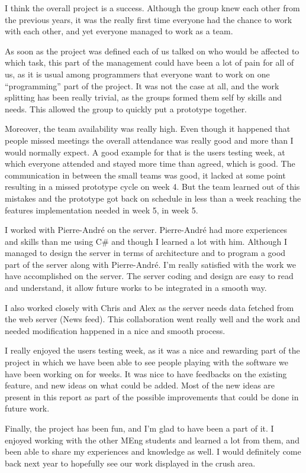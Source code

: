 I think the overall project is a success. Although the group knew each
other from the previous years, it was the really first time everyone had
the chance to work with each other, and yet everyone managed to work as a
team. 

As soon as the project was defined each of us talked on who would be
affected to which task, this part of the management could have been a
lot of pain for all of us, as it is usual among programmers that everyone
want to work on one ``programming'' part of the project. It was not the
case at all, and the work splitting has been really trivial, as the
groups formed them self by skills and needs. This allowed the group
to quickly put a prototype together.

Moreover, the team availability was really high. Even though it happened
that people missed meetings the overall attendance was really good and
more than I would normally expect. A good example for that is the users
testing week, at which everyone attended and stayed more time than
agreed, which is good. The communication in between the small teams was
good, it lacked at some point resulting in a missed prototype cycle
on week 4. But the team learned out of this mistakes and the prototype
got back on schedule in less than a week reaching the features
implementation needed in week 5, in week 5.

I worked with Pierre-André on the server. Pierre-André had more experiences
and skills than me using C\# and though I learned a lot with him.
Although I managed to design the server in terms of architecture and to
program a good part of the server along with Pierre-André. I'm really
satisfied with the work we have accomplished on the server. The server
coding and design are easy to read and understand, it allow future works
to be integrated in a smooth way.

I also worked closely with Chris and Alex as the server needs data fetched
from the web server (News feed). This collaboration went really well and
the work and needed modification happened in a nice and smooth process.

I really enjoyed the users testing week, as it was a nice and rewarding 
part of the project in which we have been able to see people playing with
the software we have been working on for weeks. It was nice to have feedbacks
on the existing feature, and new ideas on what could be added. Most of the
new ideas are present in this report as part of the possible improvements that
could be done in future work.

Finally, the project has been fun, and I'm glad to have been a part of it.
I enjoyed working with the other MEng students and learned a lot from them,
and been able to share my experiences and knowledge as well. I would definitely
come back next year to hopefully see our work displayed in the crush area.
